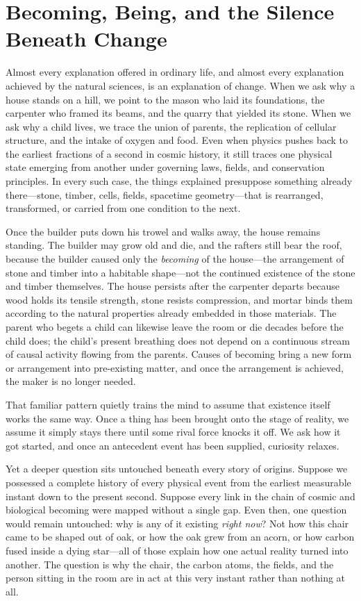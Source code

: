 \section{Becoming, Being, and the Silence Beneath Change}

Almost every explanation offered in ordinary life, and almost every explanation achieved by the natural sciences, is an explanation of change. When we ask why a house stands on a hill, we point to the mason who laid its foundations, the carpenter who framed its beams, and the quarry that yielded its stone. When we ask why a child lives, we trace the union of parents, the replication of cellular structure, and the intake of oxygen and food. Even when physics pushes back to the earliest fractions of a second in cosmic history, it still traces one physical state emerging from another under governing laws, fields, and conservation principles. In every such case, the things explained presuppose something already there---stone, timber, cells, fields, spacetime geometry---that is rearranged, transformed, or carried from one condition to the next.

Once the builder puts down his trowel and walks away, the house remains standing. The builder may grow old and die, and the rafters still bear the roof, because the builder caused only the \emph{becoming} of the house---the arrangement of stone and timber into a habitable shape---not the continued existence of the stone and timber themselves. The house persists after the carpenter departs because wood holds its tensile strength, stone resists compression, and mortar binds them according to the natural properties already embedded in those materials. The parent who begets a child can likewise leave the room or die decades before the child does; the child's present breathing does not depend on a continuous stream of causal activity flowing from the parents. Causes of becoming bring a new form or arrangement into pre-existing matter, and once the arrangement is achieved, the maker is no longer needed.

That familiar pattern quietly trains the mind to assume that existence itself works the same way. Once a thing has been brought onto the stage of reality, we assume it simply stays there until some rival force knocks it off. We ask how it got started, and once an antecedent event has been supplied, curiosity relaxes.

Yet a deeper question sits untouched beneath every story of origins. Suppose we possessed a complete history of every physical event from the earliest measurable instant down to the present second. Suppose every link in the chain of cosmic and biological becoming were mapped without a single gap. Even then, one question would remain untouched: why is any of it existing \emph{right now}? Not how this chair came to be shaped out of oak, or how the oak grew from an acorn, or how carbon fused inside a dying star---all of those explain how one actual reality turned into another. The question is why the chair, the carbon atoms, the fields, and the person sitting in the room are in act at this very instant rather than nothing at all.

